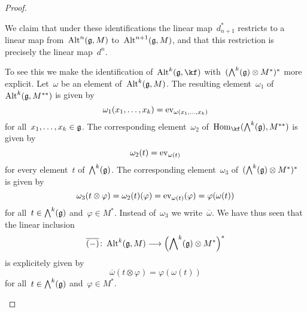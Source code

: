 \begin{proof}
\begin{enumerate}
      We claim that under these identifications the linear map~$d_{n+1}^*$ restricts to a linear map from~$\operatorname{Alt}^n(\mathfrak{g}, M)$ to~$\operatorname{Alt}^{n+1}(\mathfrak{g}, M)$, and that this restriction is precisely the linear map~$d^n$.

      To see this we make the identification of~$\Alt^k(\glie, \kf)$ with~$( \operatorname{\bigwedge}^k(\mathfrak{g}) \otimes M^* )^*$ more explicit.
      Let~$\omega$ be an element of~$\operatorname{Alt}^k(\mathfrak{g}, M)$.
      The resulting element~$\omega_1$ of~$\operatorname{Alt}^k(\mathfrak{g}, M^{**})$ is given by
      \[
        \omega_1(x_1, \dotsc, x_k)
        =
        \operatorname{ev}_{\omega(x_1, \dotsc, x_k)}
      \]
      for all~$x_1, \dotsc, x_k \in \mathfrak{g}$.
      The corresponding element~$\omega_2$ of~$\Hom_{\kf}( \Exterior^k(\glie), M^{**} )$ is given by
      \[
        \omega_2(t)
        =
        \operatorname{ev}_{\omega(t)}
      \]
      for every element~$t$ of~$\operatorname{\bigwedge}^k(\mathfrak{g})$.
      The corresponding element~$\omega_3$ of~$( \operatorname{\bigwedge}^k(\mathfrak{g}) \otimes M^* )^*$ is given by
      \[
        \omega_3(t \otimes \varphi)
        =
        \omega_2(t)(\varphi)
        =
        \operatorname{ev}_{\omega(t)}(\varphi)
        =
        \varphi(\omega(t))
      \]
      for all~$t \in \operatorname{\bigwedge}^k(\mathfrak{g})$ and~$\varphi \in M^*$.
      Instead of~$\omega_3$ we write~$\overline{\omega}$.
      We have thus seen that the linear inclusion
      \[
        \overline{ (-) }
        \colon
        \Alt^k(\glie, M)
        \to
        \Bigl( \Exterior^k(\glie) \otimes M^* \Bigr)^*
      \]
      is explicitely given by
      \[
        \overline{\omega}(t \otimes \varphi)
        =
        \varphi(\omega(t))
      \]
      for all~$t \in \operatorname{\bigwedge}^k(\mathfrak{g})$ and~$\varphi \in M^*$.


\end{enumerate}
\end{proof}
